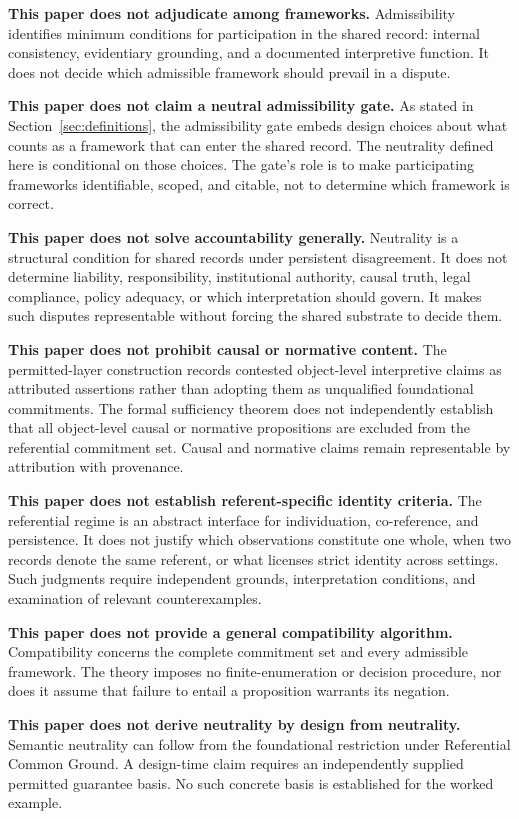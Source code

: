 \documentclass[11pt]{article}
\theoremstyle{plain}
\theoremstyle{definition}
\theoremstyle{remark}
\newcommand{\SecRef}[1]{Section~\ref{#1}}
\begin{document}
\textbf{This paper does not adjudicate among frameworks.}
Admissibility identifies minimum conditions for participation in the shared
record:
internal consistency,
evidentiary grounding,
and a documented interpretive function.
It does not decide which admissible framework should prevail in a dispute.

\textbf{This paper does not claim a neutral admissibility gate.}
As stated in \SecRef{sec:definitions},
the admissibility gate embeds design choices about what counts as
a framework that can enter the shared record.
The neutrality defined here is conditional on those choices.
The gate's role is to make participating frameworks identifiable,
scoped, and citable,
not to determine which framework is correct.

\textbf{This paper does not solve accountability generally.}
Neutrality is a structural condition for
shared records under persistent disagreement.
It does not determine liability, responsibility, institutional authority,
causal truth, legal compliance, policy adequacy, or
which interpretation should govern.
It makes such disputes representable without
forcing the shared substrate to decide them.

\textbf{This paper does not prohibit causal or normative content.}
The permitted-layer construction records contested object-level
interpretive claims as attributed assertions rather than adopting them
as unqualified foundational commitments.
The formal sufficiency theorem does not independently establish that
all object-level causal or normative propositions are excluded from
the referential commitment set.
Causal and normative claims remain representable by attribution with provenance.

\textbf{This paper does not establish referent-specific identity criteria.}
The referential regime is an abstract interface for individuation,
co-reference, and persistence.
It does not justify which observations constitute one whole,
when two records denote the same referent,
or what licenses strict identity across settings.
Such judgments require independent grounds, interpretation conditions,
and examination of relevant counterexamples.

\textbf{This paper does not provide a general compatibility algorithm.}
Compatibility concerns the complete commitment set and every admissible
framework.
The theory imposes no finite-enumeration or decision procedure,
nor does it assume that failure to entail a proposition warrants
its negation.

\textbf{This paper does not derive neutrality by design from neutrality.}
Semantic neutrality can follow from the foundational restriction under
Referential Common Ground.
A design-time claim requires an independently
supplied permitted guarantee basis.
No such concrete basis is established for the worked example.
\end{document}
